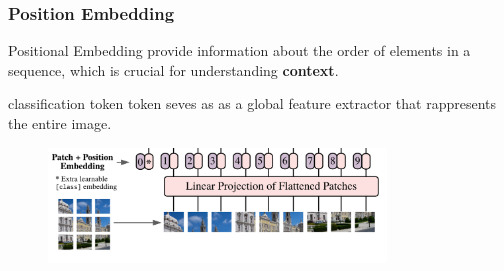 \begin{frame}
\frametitle{Position Embedding}

Positional Embedding provide information about the order of elements in a sequence, which is crucial for understanding \textbf{context}.

\vspace{0.5cm}

classification token token seves as as a global feature extractor that rappresents the entire image.

\begin{figure}[H]  %
    \begin{center}
        \includegraphics[width=0.8\textwidth]{img/2-section/Posizion enbedding.png}
        
    \end{center}
\end{figure}

\end{frame}

